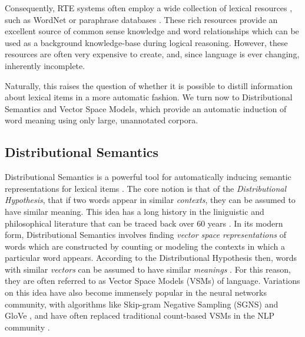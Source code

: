 \documentclass[12pt]{article}
\begin{document}
Consequently, RTE systems often employ a wide collection of lexical resources
\cite{maccartney:2008:coling,bjerva:2014:semeval,beltagy:2016:cl}, such as
WordNet \cite{miller:1995:acm} or paraphrase databases
\cite{ganitkevitch:2013:naacl}.  These rich resources provide an excellent
source of common sense knowledge and word relationships which can be used as a
background knowledge-base during logical reasoning. However, these resources
are often very expensive to create, and, since language is ever changing,
inherently incomplete.

Naturally, this raises the question of whether it is possible to distill
information about lexical items in a more automatic fashion. We turn now to
Distributional Semantics and Vector Space Models, which provide an automatic
induction of word meaning using only large, unannotated corpora.

\subsection{Distributional Semantics}
\label{sec:dist}

Distributional Semantics is a powerful tool for automatically inducing semantic
representations for lexical items \cite{turney:2010:jair,erk:2012:llc}.  The
core notion is that of the {\em Distributional Hypothesis}, that if two words
appear in similar {\em contexts}, they can be assumed to have similar meaning.
This idea has a long history in the liniguistic and philosophical literature that
can be traced back over 60 years
\cite{wittgenstein:1953:pi,harris:1954:word,firth:1957:la}. In its modern form,
Distributional Semantics involves finding {\em vector space representations} of
words which are constructed by counting or modeling the contexts in which a
particular word appears. According to the Distributional Hypothesis then, words
with similar {\em vectors} can be assumed to have similar {\em meanings}
\cite{turney:2010:jair}. For this reason, they are often referred to as
Vector Space Models (VSMs) of language. Variations on this idea have also
become immensely popular in the neural networks community, with algorithms
like Skip-gram Negative Sampling (SGNS) \cite{mikolov:2013:iclr} and GloVe
\cite{pennington:2014:emnlp}, and have often replaced traditional count-based
VSMs in the NLP community \cite{baroni:2014:acl}.
\end{document}
